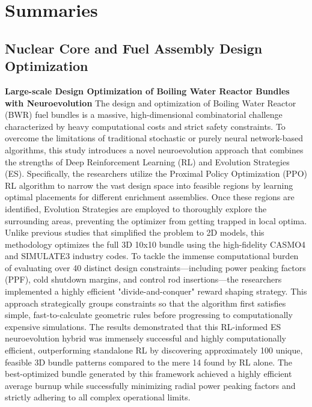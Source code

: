 \documentclass{article}
\begin{document}
\newpage
\section{Summaries}
\subsection{Nuclear Core and Fuel Assembly Design Optimization}
\textbf{Large-scale Design Optimization of Boiling Water Reactor Bundles with Neuroevolution}
\newline
The design and optimization of Boiling Water Reactor (BWR) fuel bundles is a massive, high-dimensional combinatorial challenge characterized by heavy computational costs and strict safety constraints. To overcome the limitations of traditional stochastic or purely neural network-based algorithms, this study introduces a novel neuroevolution approach that combines the strengths of Deep Reinforcement Learning (RL) and Evolution Strategies (ES). Specifically, the researchers utilize the Proximal Policy Optimization (PPO) RL algorithm to narrow the vast design space into feasible regions by learning optimal placements for different enrichment assemblies. Once these regions are identified, Evolution Strategies are employed to thoroughly explore the surrounding areas, preventing the optimizer from getting trapped in local optima. Unlike previous studies that simplified the problem to 2D models, this methodology optimizes the full 3D 10x10 bundle using the high-fidelity CASMO4 and SIMULATE3 industry codes.
\newline
To tackle the immense computational burden of evaluating over 40 distinct design constraints—including power peaking factors (PPF), cold shutdown margins, and control rod insertions—the researchers implemented a highly efficient "divide-and-conquer" reward shaping strategy. This approach strategically groups constraints so that the algorithm first satisfies simple, fast-to-calculate geometric rules before progressing to computationally expensive simulations. The results demonstrated that this RL-informed ES neuroevolution hybrid was immensely successful and highly computationally efficient, outperforming standalone RL by discovering approximately 100 unique, feasible 3D bundle patterns compared to the mere 14 found by RL alone. The best-optimized bundle generated by this framework achieved a highly efficient average burnup while successfully minimizing radial power peaking factors and strictly adhering to all complex operational limits.
\newline
\end{document}
